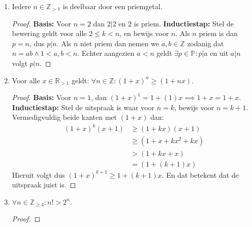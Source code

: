 \documentclass{article}
\begin{document}
\begin{enumerate}[label=\alph*)]
\begin{proof}
            \textbf{Inductiestap:}
            Stel de uitspraak is waar voor $n=k$, en bewijs voor $n=k+1$. Gebruik $3^{2k-1}+2^{k-1}=7p$ voor een zeker $p \in \mathbb{Z}$.    
            \begin{align*}
                3^{2(k+1)+1} + 2^{(k+1)-1} &= 3^2 \cdot 3^{2k+1} + 2 \cdot 2^{k-1} \\
                &= 9 \cdot (7p-2^{k-1}) + 2 \cdot 2^{k-1} \quad (\text{Vervang }3^{2n+1} = 7p-2^{n-1} )\\
                &= 9 \cdot 7p-9 \cdot 2^{k-1} + 2 \cdot 2^{k-1} \\
                &= 9 \cdot 7p+2^{k-1}(-9+2) \\
                &= 7 \cdot 9p+7 \cdot 2^{k-1} \\
                &= 7(9p+2^{k-1})
            \end{align*}
            De uitspraak geldt dus ook voor $n=k+1$ en daarmee is het bewijs voltooid.
        \end{proof}
    \item Iedere $n \in \mathbb{Z}_{>1}$ is deelbaar door een priemgetal.
        \begin{proof}
            \textbf{Basis:} Voor $n=2$ dan $2 | 2$ en $2$ is priem.
            \textbf{Inductiestap:} Stel de bewering geldt voor alle $2 \leq k < n$, en bewijs voor $n$.
            Als $n$ priem is dan $p = n$, dus $p | n$. Als $n$ niet priem dan nemen we $a, b \in \mathbb{Z}$ zodanig dat $n=ab \wedge 1 < a, b < n$.
            Echter aangezien $a < n$ geldt $\exists p \in \mathbb{P} : p | a$ en uit $  a | n$ volgt $p | n$.
        \end{proof}
    \item Voor alle $x \in \mathbb{R}_{>1}$ geldt: $\forall n \in \mathbb{Z}: (1+x)^n \geq (1+nx)$. 
        \begin{proof}
            \textbf{Basis:} Voor $n=1$, dan $(1+x)^1 = 1+(1)x \implies 1 + x = 1+ x$. 
            \textbf{Inductiestap:} Stel de uitspraak is waar voor $n=k$, bewijs voor $n=k+1$.
            Vermedigvuldig beide kanten met $(1+x)$ dan:
                \begin{align*}
                    (1+x)^k(x+1) &\geq (1 + kx)(x+1) \\
                    &\geq (1 + x + kx^2 + kx) \\
                    &> (1+kx +x) \\  
                    &= (1+(k+1)x)
                \end{align*}
                Hieruit volgt dus $(1+x)^{k+1} \geq 1+(k+1)x$. En dat betekent dat de uitspraak juist is.
        \end{proof}
    \item $\forall n \in \mathbb{Z}_{\geq 4}: n! > 2^n.$
    \begin{proof}
        
    \end{proof}

    
\end{enumerate}
\end{document}
